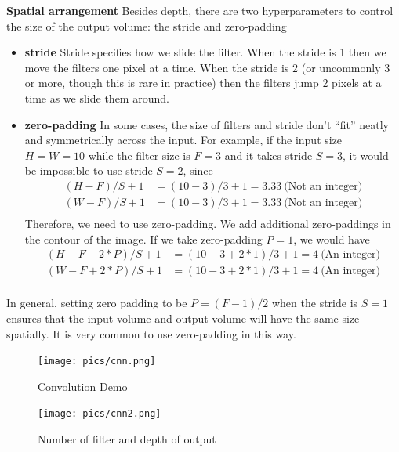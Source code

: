\documentclass[twoside]{article}
\begin{document}
\textbf{Spatial arrangement} Besides depth, there are two hyperparameters to control the size of the output volume: the stride and zero-padding
\begin{itemize}
\item \textbf{stride} Stride specifies how we slide the filter. When the stride is 1 then we move the filters one pixel at a time. When the stride is 2 (or uncommonly 3 or more, though this is rare in practice) then the filters jump 2 pixels at a time as we slide them around.
\item \textbf{zero-padding} In some cases, the size of filters and stride don’t “fit” neatly and symmetrically across the input. For example, if the input size $H=W=10$ while the filter size is $F=3$ and it takes stride $S=3$, it would be impossible to use stride $S=2$, since
\begin{equation}
\begin{aligned}
(H-F)/S+1&=(10-3)/3+1=3.33~\text{(Not an integer)}\\
(W-F)/S+1&=(10-3)/3+1=3.33~\text{(Not an integer)}\\
\end{aligned}
\end{equation}
Therefore, we need to use zero-padding. We add additional zero-paddings in the contour of the image. If we take zero-padding $P=1$, we would have
\begin{equation}
\begin{aligned}
(H-F+2*P)/S+1&=(10-3+2*1)/3+1=4~\text{(An integer)}\\
(W-F+2*P)/S+1&=(10-3+2*1)/3+1=4~\text{(An integer)}\\
\end{aligned}
\end{equation}
\end{itemize}

In general, setting zero padding to be $P=(F−1)/2$ when the stride is $S=1$ ensures that the input volume and output volume will have the same size spatially. It is very common to use zero-padding in this way.

\begin{figure}[!htb]
\centering
\texttt{[image: pics/cnn.png]}
\caption{Convolution Demo\cite{cs231n-website}}
\label{fig:conv_demo}
\end{figure}

\begin{figure}[!htb]
\centering
\texttt{[image: pics/cnn2.png]}
\caption{Number of filter and depth of output\cite{cs231n-website}}
\label{fig:conv_demo2}
\end{figure}
\end{document}
